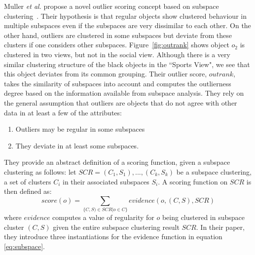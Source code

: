 \begin{description}
Muller {\em et al.} propose a novel outlier scoring concept based on subspace clustering~\cite{Muller2012}. Their hypothesis is that regular objects show clustered behaviour in multiple subspaces even if the subspaces are very dissimilar to each other. On the other hand, outliers are clustered in some subspaces but deviate from these clusters if one considers other subspaces. Figure~\ref{fig:outrank} shows object $o_{2}$ is clustered in two views, but not in the social view. Although there is a very similar clustering structure of the black objects in the ``Sports View", we see that this object deviates from its common grouping. Their outlier score, $\textit{outrank}$, takes the similarity of subspaces into account and computes the outlierness degree based on the information available from subspace analysis. They rely on the general assumption that outliers are objects that do not agree with other data in at least a few of the attributes:  
\begin{enumerate}
	\item Outliers may be regular in some subspaces
	\item They deviate in at least some subspaces.
\end{enumerate}
They provide an abstract definition of a scoring function, given a subspace clustering as follows: let $SCR={(C_{1}, S_{1}),...,(C_{k}, S_{k})}$ be a subspace clustering, a set of clusters $C_{i}$ in their associated subspaces $S_{i}$. A scoring function on $SCR$ is then defined as: 
\begin{equation}\label{eq:subspace}
score(o)=\sum_{\{C,S)\in SCR | o\in C\}} evidence(o, (C,S), SCR)
\end{equation}
where $\textit{evidence}$ computes a value of regularity for $o$ being clustered in subspace cluster $(C,S)$ given the entire subspace clustering result $SCR$. In their paper, they introduce three instantiations for the evidence function in equation \ref{eq:subspace}. 
\begin{figure}[!htbp]
	\centering
\end{figure}
\end{description}
